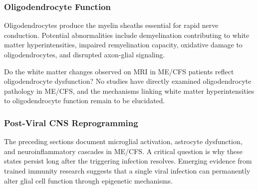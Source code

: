 \subsubsection{Oligodendrocyte Function}

Oligodendrocytes produce the myelin sheaths essential for rapid nerve conduction. Potential abnormalities include demyelination contributing to white matter hyperintensities, impaired remyelination capacity, oxidative damage to oligodendrocytes, and disrupted axon-glial signaling.

\begin{open_question}
\label{q:oligodendrocyte}
Do the white matter changes observed on MRI in ME/CFS patients reflect oligodendrocyte dysfunction? No studies have directly examined oligodendrocyte pathology in ME/CFS, and the mechanisms linking white matter hyperintensities to oligodendrocyte function remain to be elucidated.
\end{open_question}

\subsubsection{Post-Viral CNS Reprogramming}

The preceding sections document microglial activation, astrocyte dysfunction, and neuroinflammatory cascades in ME/CFS. A critical question is why these states persist long after the triggering infection resolves. Emerging evidence from trained immunity research suggests that a single viral infection can permanently alter glial cell function through epigenetic mechanisms.

